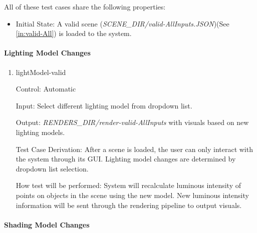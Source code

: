 \documentclass[12pt, titlepage]{article}
\begin{document}
All of these test cases share the following properties:
\begin{itemize}
	\item[] Initial State: A valid scene 
	(\textit{SCENE\_DIR/valid-AllInputs.JSON})(See \ref{in:valid-All}) is 
	loaded to the system.
\end{itemize}

\paragraph{Lighting Model Changes}

\begin{enumerate}
	
	\item{lightModel-valid\\}
	
	Control: Automatic
	
	Input: Select different lighting model from dropdown list. 
	
	Output: \textit{RENDERS\_DIR/render-valid-AllInputs} with visuals based on 
	new lighting models.
	
	Test Case Derivation: After a scene is loaded, the user can only interact 
	with the system through its GUI. Lighting model changes are determined by 
	dropdown list selection.
	
	How test will be performed: System will recalculate luminous intensity of 
	points on objects in the scene using the new model. New luminous intensity 
	information will be sent through the rendering pipeline to output
        visuals. 
	
\end{enumerate}

\paragraph{Shading Model Changes}
\end{document}
